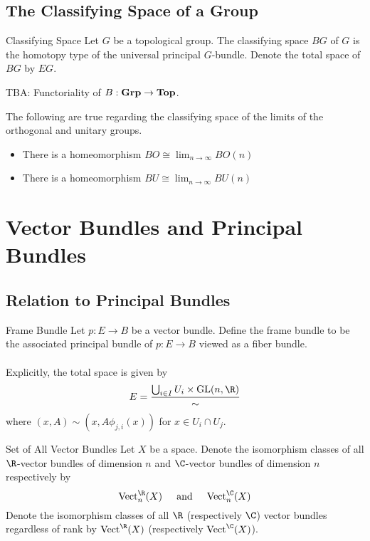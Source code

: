 \documentclass[a4paper]{article}
\begin{document}
\subsection{The Classifying Space of a Group}
\begin{defn}{Classifying Space}{} Let $G$ be a topological group. The classifying space $BG$ of $G$ is the homotopy type of the universal principal $G$-bundle. Denote the total space of $BG$ by $EG$. 
\end{defn}

TBA: Functoriality of $B:\bold{Grp}\to\bold{Top}$. 

\begin{prp}{}{} The following are true regarding the classifying space of the limits of the orthogonal and unitary groups. 
\begin{itemize}
\item There is a homeomorphism $BO\cong\lim_{n\to\infty}BO(n)$
\item There is a homeomorphism $BU\cong\lim_{n\to\infty}BU(n)$
\end{itemize}
\end{prp}

\pagebreak
\section{Vector Bundles and Principal Bundles}
\subsection{Relation to Principal Bundles}
\begin{defn}{Frame Bundle}{} Let $p:E\to B$ be a vector bundle. Define the frame bundle to be the associated principal bundle of $p:E\to B$ viewed as a fiber bundle. \\~\\

Explicitly, the total space is given by $$E=\frac{\bigcup_{i\in I}U_i\times\text{GL}(n,\R)}{\sim}$$ where $(x,A)\sim(x,A\phi_{j,i}(x))$ for $x\in U_i\cap U_j$. 
\end{defn}

\begin{defn}{Set of All Vector Bundles}{} Let $X$ be a space. Denote the isomorphism classes of all $\R$-vector bundles of dimension $n$ and $\C$-vector bundles of dimension $n$ respectively by $$\text{Vect}_n^\R(X)\;\;\;\;\text{ and }\;\;\;\;\text{Vect}_n^\C(X)$$ Denote the isomorphism classes of all $\R$ (respectively $\C$) vector bundles regardless of rank by $\text{Vect}^\R(X)$ (respectively $\text{Vect}^\C(X)$). 
\end{defn}
\end{document}
